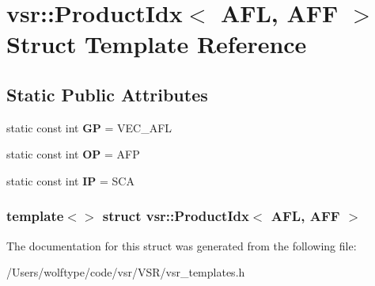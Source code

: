 \hypertarget{structvsr_1_1_product_idx_3_01_a_f_l_00_01_a_f_f_01_4}{\section{vsr\-:\-:Product\-Idx$<$ A\-F\-L, A\-F\-F $>$ Struct Template Reference}
\label{structvsr_1_1_product_idx_3_01_a_f_l_00_01_a_f_f_01_4}
}
\subsection*{Static Public Attributes}
\begin{DoxyCompactItemize}
\item 
\hypertarget{structvsr_1_1_product_idx_3_01_a_f_l_00_01_a_f_f_01_4_a25a44dadc83427ca970a8844f287446a}{static const int {\bfseries G\-P} = V\-E\-C\-\_\-\-A\-F\-L}\label{structvsr_1_1_product_idx_3_01_a_f_l_00_01_a_f_f_01_4_a25a44dadc83427ca970a8844f287446a}

\item 
\hypertarget{structvsr_1_1_product_idx_3_01_a_f_l_00_01_a_f_f_01_4_a60664f18b68bb564f9605520c83a5ed2}{static const int {\bfseries O\-P} = A\-F\-P}\label{structvsr_1_1_product_idx_3_01_a_f_l_00_01_a_f_f_01_4_a60664f18b68bb564f9605520c83a5ed2}

\item 
\hypertarget{structvsr_1_1_product_idx_3_01_a_f_l_00_01_a_f_f_01_4_a311690cc733e248ddbd28da5ea09e332}{static const int {\bfseries I\-P} = S\-C\-A}\label{structvsr_1_1_product_idx_3_01_a_f_l_00_01_a_f_f_01_4_a311690cc733e248ddbd28da5ea09e332}

\end{DoxyCompactItemize}
\subsubsection*{template$<$$>$ struct vsr\-::\-Product\-Idx$<$ A\-F\-L, A\-F\-F $>$}



The documentation for this struct was generated from the following file\-:\begin{DoxyCompactItemize}
\item 
/\-Users/wolftype/code/vsr/\-V\-S\-R/vsr\-\_\-templates.\-h\end{DoxyCompactItemize}
